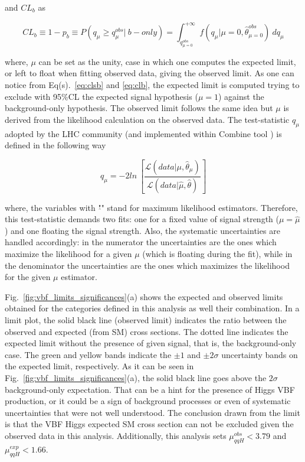 and $CL_{b}$ as

\begin{equation}
\label{eq:clb}
CL_{b} \equiv 1-p_{b} \equiv P(q_{\mu} \geq q_{\mu}^{obs} | ~b-only) = \int_{q_{\mu=0}^{obs}}^{+\infty} \mathit{f}(q_{\mu} | \mu=0, \hat{\theta}_{\mu=0}^{obs}) ~dq_{\mu}
\end{equation}

where, $\mu$ can be set as the unity, case in which one computes the expected limit, or left to float when fitting observed data, giving the observed limit. As one can notice from Eq(s).~\ref{eq:clsb} and \ref{eq:clb}, the expected limit is computed trying to exclude with 95$\%$CL the expected signal hypothesis ($\mu = 1$) against the background-only hypothesis. The observed limit follows the same idea but $\mu$ is derived from the likelihood calculation on the observed data. The test-statistic $q_{\mu}$ adopted by the LHC community (and implemented within Combine tool \cite{bib:HiggsCombineToolFNALWorkshop2018,bib:Eilam-ESWB-2018-1,bib:Eilam-ESWB-2018-2}) is defined in the following way

\begin{equation}
q_{\mu} = -2ln~\left[ \frac{\mathcal{L}(data|\mu,\hat{\theta}_{\mu})}{\mathcal{L}(data|\hat{\mu},\hat{\theta})} \right]
\end{equation}

where, the variables with "$\hat{}$" stand for maximum likelihood estimators. Therefore, this test-statistic demands two fits: one for a fixed value of signal strength ($\mu = \hat{\mu}$) and one floating the signal strength. Also, the systematic uncertainties are handled accordingly: in the numerator the uncertainties are the ones which maximize the likelihood for a given $\mu$ (which is floating during the fit), while in the denominator the uncertainties are the ones which maximizes the likelihood for the given $\mu$ estimator. 

Fig.~\ref{fig:vbf_limits_significances}(a) shows the expected and observed limits obtained for the categories defined in this analysis as well their combination. In a limit plot, the solid black line (observed limit) indicates the ratio between the observed and expected (from SM) cross sections. The dotted line indicates the expected limit without the presence of given signal, that is, the background-only case. The green and yellow bands indicate the $\pm1$ and $\pm2\sigma$ uncertainty bands on the expected limit, respectively. As it can be seen in Fig.~\ref{fig:vbf_limits_significances}(a), the solid black line goes above the $2\sigma$ background-only expectation. That can be a hint for the presence of Higgs VBF production, or it could be a sign of background processes or even of systematic uncertainties that were not well understood. The conclusion drawn from the limit is that the VBF Higgs expected SM cross section can not be excluded given the observed data in this analysis. Additionally, this analysis sets $\mu_{qqH}^{obs} < 3.79$ and $\mu_{qqH}^{exp} < 1.66$.

